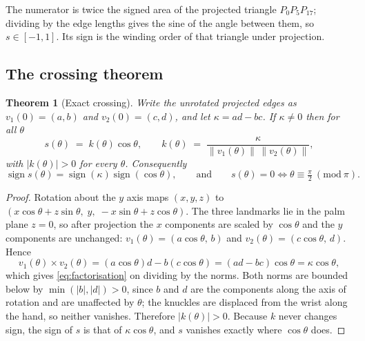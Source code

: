 \documentclass{article}
\newtheorem{theorem}{Theorem}
\theoremstyle{definition}
\begin{document}
The numerator is twice the signed area of the projected triangle
$P_0 P_5 P_{17}$; dividing by the edge lengths gives the sine of the angle
between them, so $s \in [-1, 1]$. Its sign is the winding order of that triangle
under projection.

\subsection{The crossing theorem}

\begin{theorem}[Exact crossing]
\label{thm:crossing}
Write the unrotated projected edges as $v_1(0) = (a, b)$ and $v_2(0) = (c, d)$,
and let $\kappa = ad - bc$. If $\kappa \neq 0$ then for all $\theta$
\begin{equation}
  s(\theta) \;=\; k(\theta)\cos\theta,
  \qquad
  k(\theta) \;=\; \frac{\kappa}{\lVert v_1(\theta) \rVert \, \lVert v_2(\theta) \rVert},
  \label{eq:factorisation}
\end{equation}
with $|k(\theta)| > 0$ for every $\theta$. Consequently
\begin{equation}
  \operatorname{sign} s(\theta) = \operatorname{sign}(\kappa)\operatorname{sign}(\cos\theta),
  \qquad\text{and}\qquad
  s(\theta) = 0 \iff \theta \equiv \tfrac{\pi}{2} \ (\mathrm{mod}\ \pi).
\end{equation}
\end{theorem}

\begin{proof}
Rotation about the $y$ axis maps $(x, y, z)$ to
$(x\cos\theta + z\sin\theta,\; y,\; -x\sin\theta + z\cos\theta)$. The three
landmarks lie in the palm plane $z = 0$, so after projection the $x$ components
are scaled by $\cos\theta$ and the $y$ components are unchanged:
$v_1(\theta) = (a\cos\theta,\, b)$ and $v_2(\theta) = (c\cos\theta,\, d)$. Hence
\begin{equation}
  v_1(\theta) \times v_2(\theta)
  = (a\cos\theta)d - b(c\cos\theta)
  = (ad - bc)\cos\theta
  = \kappa\cos\theta ,
\end{equation}
which gives \eqref{eq:factorisation} on dividing by the norms. Both norms are
bounded below by $\min(|b|, |d|) > 0$, since $b$ and $d$ are the components along
the axis of rotation and are unaffected by $\theta$; the knuckles are displaced
from the wrist along the hand, so neither vanishes. Therefore $|k(\theta)| > 0$.
Because $k$ never changes sign, the sign of $s$ is that of $\kappa\cos\theta$,
and $s$ vanishes exactly where $\cos\theta$ does.
\end{proof}
\end{document}
